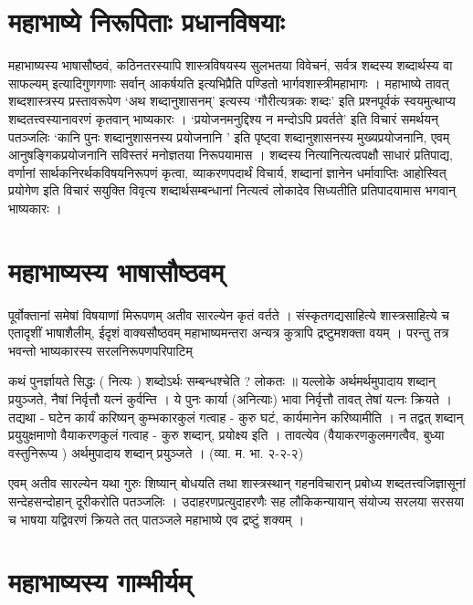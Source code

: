 \section*{महाभाष्ये निरूपिताः प्रधानविषयाः}

महाभाष्यस्य भाषासौष्ठवं, कठिनतरस्यापि शास्त्रविषयस्य सुलभतया विवेचनं, सर्वत्र शब्दस्य शब्दार्थस्य वा साफल्यम् इत्यादिगुणगणाः सर्वान् आकर्षयति इत्यभिप्रैति पण्डितो भार्गवशास्त्रीमहाभागः । महाभाष्ये तावत् शब्दशास्त्रस्य प्रस्तावरूपेण ‘अथ शब्दानुशासनम्’ इत्यस्य ‘गौरीत्यत्रकः शब्दः’ इति प्रश्नपूर्वकं स्वयमुत्थाप्य शब्दतत्त्वस्यानावरणं कृतवान् भाष्यकारः । ‘प्रयोजनमनुद्दिश्य न मन्दोऽपि प्रवर्तते’ इति विचारं समर्थयन् पतञ्जलिः ‘कानि पुनः शब्दानुशासनस्य प्रयोजनानि ’ इति पृष्ट्वा शब्दानुशासनस्य मुख्यप्रयोजनानि, एवम् आनुषङ्गिकप्रयोजनानि सविस्तरं मनोज्ञतया निरूपयामास । शब्दस्य नित्यानित्यत्वपक्षौ साधारं प्रतिपाद्य, वर्णानां सार्थकनिरर्थकविषयनिरूपणं कृत्वा, व्याकरणपदार्थं विचार्य, शब्दानां ज्ञानेन धर्मावाप्तिः आहोस्वित् प्रयोगेण इति विचारं सयुक्ति विवृत्य शब्दार्थसम्बन्धानां नित्यत्वं लोकादेव सिध्यतीति प्रतिपादयामास भगवान् भाष्यकारः ।

\section*{महाभाष्यस्य भाषासौष्ठवम्}

पूर्वोक्तानां समेषां विषयाणां मिरूपणम् अतीव सारल्येन कृतं वर्तते । संस्कृतगद्यसाहित्ये शास्त्रसाहित्ये च एतादृशीं भाषाशैलीम्, ईदृशं वाक्यसौष्ठवम् महाभाष्यमन्तरा अन्यत्र कुत्रापि द्रष्टुमशक्ता वयम् । परन्तु तत्र भवन्तो भाष्यकारस्य सरलनिरूपणपरिपाटिम्

कथं पुनर्ज्ञायते सिद्धः ( नित्यः ) शब्दोऽर्थः सम्बन्धश्चेति ? लोकतः ॥ यल्लोके अर्थमर्थमुपादाय शब्दान् प्रयुञ्जते, नैषां निर्वृत्तौ यत्नं कुर्वन्ति । ये पुनः कार्या (अनित्याः) भावा निर्वृत्तौ तावत् तेषां यत्नः क्रियते । तद्यथा - घटेन कार्यं करिष्यन् कुम्भकारकुलं गत्वाह - कुरु घटं, कार्यमानेन करिष्यामीति । न तद्वत् शब्दान् प्रयुयुक्षमाणो वैयाकरणकुलं गत्वाह - कुरु शब्दान्, प्रयोक्ष्य इति । तावत्येव (वैयाकरणकुलमगत्वैव, बुध्या वस्तुनिरूप्य ) अर्थमुपादाय शब्दान् प्रयुञ्जते । (व्या. म. भा. २-२-२)

एवम् अतीव सारल्येन यथा गुरुः शिष्यान् बोधयति तथा शास्त्रस्थान् गहनविचारान् प्रबोध्य शब्दतत्त्वजिज्ञासूनां सन्देहसन्दोहान् दूरीकरोति पतञ्जलिः । उदाहरणप्रत्युदाहरणैः सह लौकिकन्यायान् संयोज्य सरलया सरसया च भाषया यद्विवरणं क्रियते तत् पातञ्जले महाभाष्ये एव द्रष्टुं शक्यम् ।

\section*{महाभाष्यस्य गाम्भीर्यम्}


